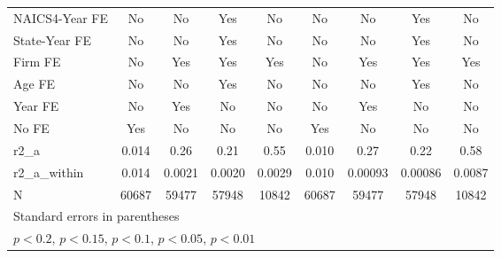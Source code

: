 {\begin{tabular}{l*{8}{c}}
\addlinespace
NAICS4-Year FE      &          No         &          No         &         Yes         &          No         &          No         &          No         &         Yes         &          No         \\
\addlinespace
State-Year FE       &          No         &          No         &         Yes         &          No         &          No         &          No         &         Yes         &          No         \\
\addlinespace
Firm FE             &          No         &         Yes         &         Yes         &         Yes         &          No         &         Yes         &         Yes         &         Yes         \\
\addlinespace
Age FE              &          No         &          No         &         Yes         &          No         &          No         &          No         &         Yes         &          No         \\
\addlinespace
Year FE             &          No         &         Yes         &          No         &          No         &          No         &         Yes         &          No         &          No         \\
\addlinespace
No FE               &         Yes         &          No         &          No         &          No         &         Yes         &          No         &          No         &          No         \\
\midrule
r2\_a                &       0.014         &        0.26         &        0.21         &        0.55         &       0.010         &        0.27         &        0.22         &        0.58         \\
r2\_a\_within         &       0.014         &      0.0021         &      0.0020         &      0.0029         &       0.010         &     0.00093         &     0.00086         &      0.0087         \\
N                   &       60687         &       59477         &       57948         &       10842         &       60687         &       59477         &       57948         &       10842         \\
\bottomrule
\multicolumn{9}{l}{\footnotesize Standard errors in parentheses}\\
\multicolumn{9}{l}{\footnotesize \sym{++} \(p<0.2\), \sym{+} \(p<0.15\), \sym{*} \(p<0.1\), \sym{**} \(p<0.05\), \sym{***} \(p<0.01\)}\\
\end{tabular}
}

